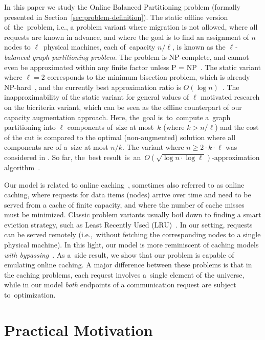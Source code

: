 \documentclass[manuscript,screen=true]{acmart}
\begin{document}
In this paper we study the Online Balanced Partitioning problem (formally presented in Section~\ref{sec:problem-definition}).
The static offline version of~the~problem, i.e., a problem variant where
migration is not allowed, where all requests are known in advance, and where
the goal is to find an assignment of $n$ nodes to $\ell$~physical machines, each of~capacity $n/\ell$, is known as the
\emph{$\ell$-balanced graph partitioning problem}. The problem is 
NP-complete, and cannot even be approximated within any finite factor unless P
= NP~\cite{AndRae06}.  The static
variant where $\ell = 2$ corresponds to the minimum bisection problem, which
is already NP-hard~\cite{GaJoSt76}, and 
the currently best approximation ratio is $O(\log n)$~\cite{SarVaz95,ArKaKa99,FeKrNi00,FeiKra02,KraFei06,Raec08}.
The inapproximability of the static variant for general values of $\ell$
motivated research on the bicriteria variant, which can be seen as the offline
counterpart of our capacity augmentation approach. Here, the~goal
is~to~compute a~graph partitioning into $\ell$ components of~size at most~$k$ (where $k > n/\ell$) and the cost of the cut is compared to the optimal (non-augmented)
solution where all components are of a~size at most $n/k$. The variant where
$n \geq 2 \cdot k \cdot \ell$ was considered in
\cite{LeMaTr90,SimTen97,EvNaRS00,EvNaRS99,KrNaSc09}. So far, the~best result~is~an~$O(\!\sqrt{\log n \cdot \log \ell})$-approximation algorithm~\cite{KrNaSc09}.

Our model is related to online
caching~\cite{SleTar85,FKLMSY91,McGSle91,AcChNo00}, sometimes also referred to
as online caching, where requests for data items (nodes) arrive over time and
need to be served from a cache of finite capacity, and where the number of
cache misses must be minimized. Classic problem variants usually boil down to
finding a smart eviction strategy, such as Least Recently Used (LRU)~\cite{SleTar85}. In our
setting, requests can be served remotely (i.e.,~without fetching the
corresponding nodes to a single physical machine). In this light, our model is more
reminiscent of caching models \emph{with
bypassing}~\cite{EpImLN11,EpImLN15,Irani02}. As a~side result, we show that our problem is
capable of emulating online caching.
A major difference between  these problems is that in the caching problems, each request involves a~single element of the universe, while in our model \emph{both} endpoints of a communication request are subject to~optimization.

\section{Practical Motivation}
\end{document}
